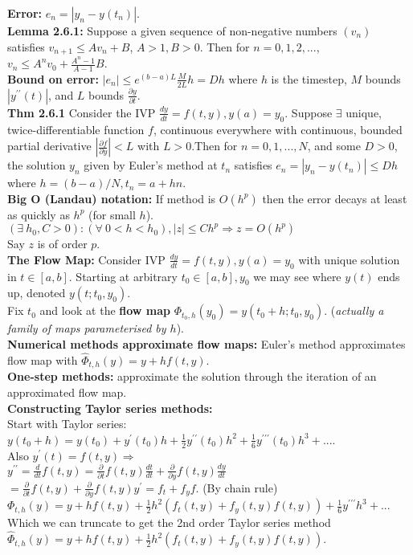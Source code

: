 \documentclass[10pt,a4paper]{article}
\renewcommand{\implies}{\Rightarrow}
\newcommand{\del}{\partial}
\begin{document}
\begin{multicols*}{2}
\textbf{Error:} $\boxed{e_n = |y_n - y(t_n)|}$.\\
\textbf{Lemma 2.6.1:} Suppose a given sequence of non-negative numbers $(v_n)$ satisfies $v_{n + 1} \leq Av_n + B$, $A > 1, B > 0$. Then for $n = 0,1,2,...$, $\boxed{v_n \leq A^nv_0 + \frac{A^n - 1}{A - 1}B}$.\\
\textbf{Bound on error:} $\boxed{|e_n| \leq e^{(b-a)L}\frac{M}{2L}h = Dh}$ where $h$ is the timestep, $M$ bounds $|y^{\prime\prime}(t)|$, and $L$ bounds $\frac{\del y}{\del t}$.\\
\textbf{Thm 2.6.1} Consider the IVP $\frac{dy}{dt} = f(t,y), y(a) = y_0$. Suppose $\exists$ unique, twice-differentiable function $f$, continuous everywhere with continuous, bounded partial derivative $\left|\frac{\del f}{\del y}\right| < L$ with $L > 0$.Then for $n = 0,1,...,N$, and some $D > 0$, the solution $y_n$ given by Euler's method at $t_n$ satisfies $\boxed{e_n = |y_n - y(t_n)| \leq Dh}$ where $h = (b-a)/N, t_n = a + hn$.\\
\textbf{Big O (Landau) notation:} If method is $O(h^p)$ then the error decays at least as quickly as $h^p$ (for small $h$).\\
$\boxed{(\exists \: h_0, C > 0):( \forall \: 0 < h < h_0), |z|\leq Ch^p \implies z = O(h^p) }$\\
Say $z$ is of order $p$.\\
\textbf{The Flow Map:} Consider IVP $\frac{dy}{dt} = f(t,y), y(a) = y_0$ with unique solution in $t \in [a,b]$. Starting at arbitrary $t_0 \in [a,b], y_0$ we may see where $y(t)$ ends up, denoted $y(t;t_0, y_0)$. \\
Fix $t_0$ and look at the \textbf{flow map} $\boxed{\Phi_{t_0, h}(y_0) = y(t_0 + h;t_0, y_0)}$.
(\textit{actually a family of maps parameterised by $h$}).\\
\textbf{Numerical methods approximate flow maps:} Euler's method approximates flow map with $\hat{\Phi}_{t, h}(y) = y + hf(t,y)$.\\
\textbf{One-step methods:} approximate the solution through the iteration of an approximated flow map.\\
\textbf{Constructing Taylor series methods:} \\
Start with Taylor series:\\
$y(t_0 + h) = y(t_0) + y^\prime(t_0)h + \frac{1}{2}y^{\prime\prime}(t_0)h^2 + \frac{1}{6}y^{\prime\prime\prime}(t_0)h^3 + ...$. \\
Also $y^\prime(t) = f(t, y) \implies$ \\
$y^{\prime\prime} = \frac{d}{dt}f(t,y) = \frac{\del}{\del t} f(t,y)\frac{dt}{dt} + \frac{\del}{\del y} f(t,y)\frac{dy}{dt}$\\
$ = \frac{\del}{\del t} f(t,y) + \frac{\del}{\del y} f(t,y)y^\prime = f_t + f_y f$. (By chain rule)\\
$\Phi_{t,h}(y) = y + hf(t,y) + \frac{1}{2}h^2(f_t(t,y) + f_y(t,y)f(t,y)) + \frac{1}{6}y^{\prime\prime\prime}h^3 + ...$ \\
Which we can truncate to get the 2nd order Taylor series method\\
$\boxed{\hat{\Phi}_{t,h}(y) = y + hf(t,y) + \frac{1}{2}h^2(f_t(t,y) + f_y(t,y)f(t,y))}$.\\



\end{multicols*}
\end{document}
